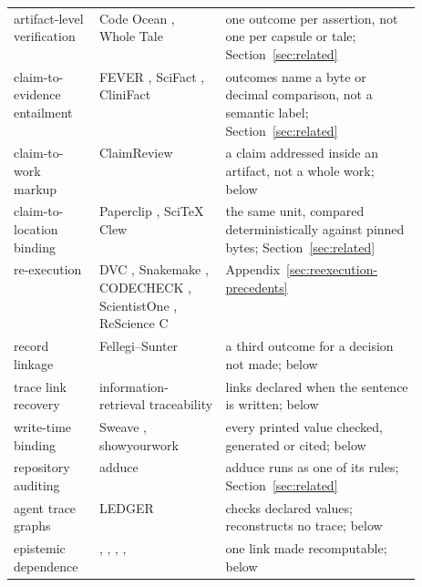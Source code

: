 \begin{table}[H]
\begin{tabularx}{\linewidth}{@{}>{\raggedright\arraybackslash}p{0.21\linewidth}>{\raggedright\arraybackslash}p{0.31\linewidth}L@{}}
artifact-level verification & Code Ocean \citep{codeocean2026verification}, Whole Tale \citep{brinckman2019wholetale} & one outcome per assertion, not one per capsule or tale; Section~\ref{sec:related} \\
claim-to-evidence entailment & FEVER \citep{thorne2018fever}, SciFact \citep{wadden2020scifact}, CliniFact \citep{clinifact2025} & outcomes name a byte or decimal comparison, not a semantic label; Section~\ref{sec:related} \\
claim-to-work markup & ClaimReview \citep{schemaorg2026claimreview,google2026factcheck} & a claim addressed inside an artifact, not a whole work; below \\
claim-to-location binding & Paperclip \citep{gxl2026paperclip}, SciTeX Clew \citep{watanabe2026clew} & the same unit, compared deterministically against pinned bytes; Section~\ref{sec:related} \\
re-execution & DVC \citep{iterative2020dvc}, Snakemake \citep{koster2012snakemake}, CODECHECK \citep{nust2021codecheck}, ScientistOne \citep{meng2026scientistone}, ReScience C \citep{rougier2017rescience} & Appendix~\ref{sec:reexecution-precedents} \\
record linkage & Fellegi--Sunter \citep{fellegi1969linkage} & a third outcome for a decision not made; below \\
trace link recovery & information-retrieval traceability \citep{borg2013traceability} & links declared when the sentence is written; below \\
write-time binding & Sweave \citep{leisch2002sweave}, showyourwork \citep{luger2021mapping} & every printed value checked, generated or cited; below \\
repository auditing & adduce \citep{chudasama2026adduce} & adduce runs \reproverify{} as one of its rules; Section~\ref{sec:related} \\
agent trace graphs & LEDGER \citep{kim2026ledger} & checks declared values; reconstructs no trace; below \\
epistemic dependence & \citet{hardwig1985dependence}, \citet{wagenknecht2014opaque}, \citet{koskinen2023noepistemology}, \citet{ortmann2025oracles}, \citet{messeri2024illusions} & one link made recomputable; below \\
\bottomrule
\end{tabularx}
\end{table}

